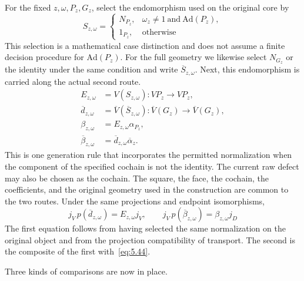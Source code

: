 \begin{construction}\label{cons:5.40}

For the fixed $z,\omega,P_z,G_z$, select the endomorphism used on the original core by
\begin{equation*}
S_{z,\omega}=
\begin{cases}
N_{P_z},&\omega_z\ne1\ \text{and}\ \mathrm{Ad}(P_z),\\
1_{P_z},&\text{otherwise}
\end{cases}
\tag{5.46}\label{eq:5.46}
\end{equation*}
This selection is a mathematical case distinction and does not assume a finite decision
procedure for $\mathrm{Ad}(P_z)$. For the full geometry we likewise select $N_{G_z}$ or
the identity under the same condition and write $\overline S_{z,\omega}$. Next, this
endomorphism is carried along the actual second route.
\begin{equation*}
\begin{aligned}
E_{z,\omega}&=V(S_{z,\omega}):VP_z\longrightarrow VP_z,\\
\overline d_{z,\omega}
 &=\overline V(\overline S_{z,\omega}):
 \overline V(G_z)\longrightarrow\overline V(G_z),\\
\beta_{z,\omega}&=E_{z,\omega}\alpha_{P_z},\\
\overline\beta_{z,\omega}
 &=\overline d_{z,\omega}\overline\alpha_z.
\end{aligned}
\tag{5.47}\label{eq:5.47}
\end{equation*}
This is one generation rule that incorporates the permitted normalization when the
component of the specified cochain is not the identity. The current raw defect may also be
chosen as the cochain. The square, the face, the cochain, the coefficients, and the
original geometry used in the construction are common to the two routes. Under the same
projections and endpoint isomorphisms,
\begin{equation*}
j_V\,p(\overline d_{z,\omega})=E_{z,\omega}j_V,
\qquad
j_V\,p(\overline\beta_{z,\omega})=\beta_{z,\omega}j_D
\tag{5.48}\label{eq:5.48}
\end{equation*}
The first equation follows from having selected the same normalization on the original
object and from the projection compatibility of transport. The second is the composite of
the first with~\eqref{eq:5.44}.

Three kinds of comparisons are now in place.


\end{construction}
